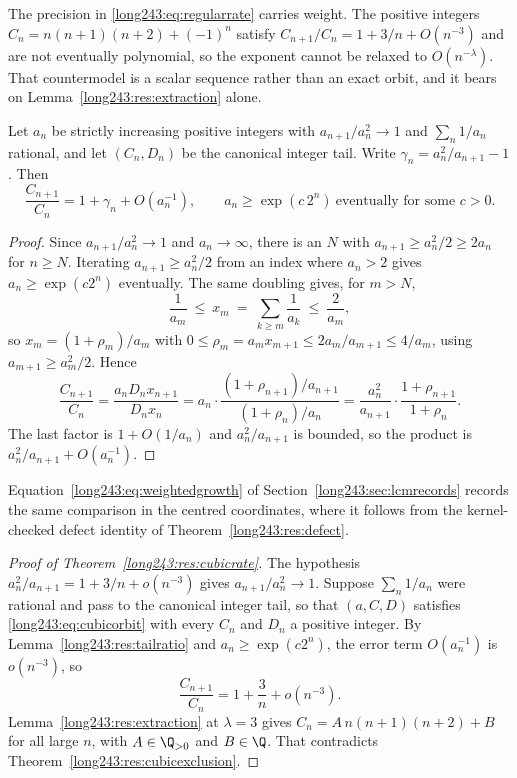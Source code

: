 \documentclass[11pt]{article}
\begin{document}
The precision in \eqref{long243:eq:regularrate} carries weight.  The positive integers
$C_n=n(n+1)(n+2)+(-1)^n$ satisfy $C_{n+1}/C_n=1+3/n+O(n^{-3})$ and are not
eventually polynomial, so the exponent cannot be relaxed to $O(n^{-\lambda})$.
That countermodel is a scalar sequence rather than an exact orbit, and it bears
on Lemma~\ref{long243:res:extraction} alone.

\begin{lemma}\label{long243:res:tailratio}
Let $a_n$ be strictly increasing positive integers with $a_{n+1}/a_n^2\to1$ and
$\sum_n1/a_n$ rational, and let $(C_n,D_n)$ be the canonical integer tail.
Write $\gamma_n=a_n^2/a_{n+1}-1$.  Then
\[
 \frac{C_{n+1}}{C_n}=1+\gamma_n+O(a_n^{-1}),
 \qquad a_n\ge\exp(c\,2^n)\ \text{eventually for some }c>0 .
\]
\end{lemma}

\begin{proof}
Since $a_{n+1}/a_n^2\to1$ and $a_n\to\infty$, there is an $N$ with
$a_{n+1}\ge a_n^2/2\ge2a_n$ for $n\ge N$.  Iterating $a_{n+1}\ge a_n^2/2$ from
an index where $a_n>2$ gives $a_n\ge\exp(c2^n)$ eventually.  The same doubling
gives, for $m>N$,
\[
 \frac1{a_m}\ \le\ x_m\ =\ \sum_{k\ge m}\frac1{a_k}\ \le\ \frac2{a_m},
\]
so $x_{m}=(1+\rho_{m})/a_{m}$ with
$0\le\rho_{m}=a_mx_{m+1}\le 2a_m/a_{m+1}\le4/a_m$, using
$a_{m+1}\ge a_m^2/2$.  Hence
\[
 \frac{C_{n+1}}{C_n}=\frac{a_nD_nx_{n+1}}{D_nx_n}
 =a_n\cdot\frac{(1+\rho_{n+1})/a_{n+1}}{(1+\rho_n)/a_n}
 =\frac{a_n^2}{a_{n+1}}\cdot\frac{1+\rho_{n+1}}{1+\rho_n}.
\]
The last factor is $1+O(1/a_n)$ and $a_n^2/a_{n+1}$ is bounded, so the product
is $a_n^2/a_{n+1}+O(a_n^{-1})$.
\end{proof}

\noindent Equation~\eqref{long243:eq:weightedgrowth} of Section~\ref{long243:sec:lcmrecords}
records the same comparison in the centred coordinates, where it follows from
the kernel-checked defect identity of Theorem~\ref{long243:res:defect}.

\begin{proof}[Proof of Theorem~\ref{long243:res:cubicrate}]
The hypothesis $a_n^2/a_{n+1}=1+3/n+o(n^{-3})$ gives $a_{n+1}/a_n^2\to1$.
Suppose $\sum_n1/a_n$ were rational and pass to the canonical integer tail, so
that $(a,C,D)$ satisfies \eqref{long243:eq:cubicorbit} with every $C_n$ and $D_n$ a
positive integer.  By Lemma~\ref{long243:res:tailratio} and $a_n\ge\exp(c2^n)$, the
error term $O(a_n^{-1})$ is $o(n^{-3})$, so
\[
 \frac{C_{n+1}}{C_n}=1+\frac3n+o(n^{-3}).
\]
Lemma~\ref{long243:res:extraction} at $\lambda=3$ gives
$C_n=A\,n(n+1)(n+2)+B$ for all large $n$, with $A\in\Q_{>0}$ and $B\in\Q$.
That contradicts Theorem~\ref{long243:res:cubicexclusion}.
\end{proof}
\end{document}
